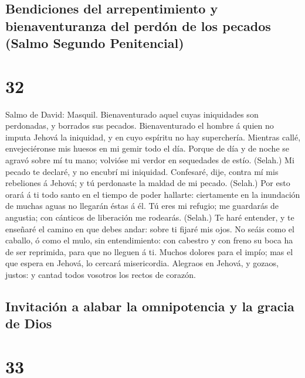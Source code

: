 \hypertarget{bendiciones-del-arrepentimiento-y-bienaventuranza-del-perduxf3n-de-los-pecados-salmo-segundo-penitencial}{%
\subsection{Bendiciones del arrepentimiento y bienaventuranza del perdón
de los pecados (Salmo Segundo
Penitencial)}\label{bendiciones-del-arrepentimiento-y-bienaventuranza-del-perduxf3n-de-los-pecados-salmo-segundo-penitencial}}

\hypertarget{section-31}{%
\section{32}\label{section-31}}

 Salmo de David: Masquil. Bienaventurado aquel cuyas
iniquidades son perdonadas, y borrados sus pecados. 
Bienaventurado el hombre á quien no imputa Jehová la iniquidad, y en
cuyo espíritu no hay superchería.  Mientras callé,
envejeciéronse mis huesos en mi gemir todo el día.  Porque
de día y de noche se agravó sobre mí tu mano; volvióse mi verdor en
sequedades de estío. (Selah.)  Mi pecado te declaré, y no
encubrí mi iniquidad. Confesaré, dije, contra mí mis rebeliones á
Jehová; y tú perdonaste la maldad de mi pecado. (Selah.) 
Por esto orará á ti todo santo en el tiempo de poder hallarte:
ciertamente en la inundación de muchas aguas no llegarán éstas á él.
 Tú eres mi refugio; me guardarás de angustia; con
cánticos de liberación me rodearás. (Selah.)  Te haré
entender, y te enseñaré el camino en que debes andar: sobre ti fijaré
mis ojos.  No seáis como el caballo, ó como el mulo, sin
entendimiento: con cabestro y con freno su boca ha de ser reprimida,
para que no lleguen á ti.  Muchos dolores para el impío;
mas el que espera en Jehová, lo cercará misericordia. 
Alegraos en Jehová, y gozaos, justos: y cantad todos vosotros los rectos
de corazón.

\hypertarget{invitaciuxf3n-a-alabar-la-omnipotencia-y-la-gracia-de-dios}{%
\subsection{Invitación a alabar la omnipotencia y la gracia de
Dios}\label{invitaciuxf3n-a-alabar-la-omnipotencia-y-la-gracia-de-dios}}

\hypertarget{section-32}{%
\section{33}\label{section-32}}

